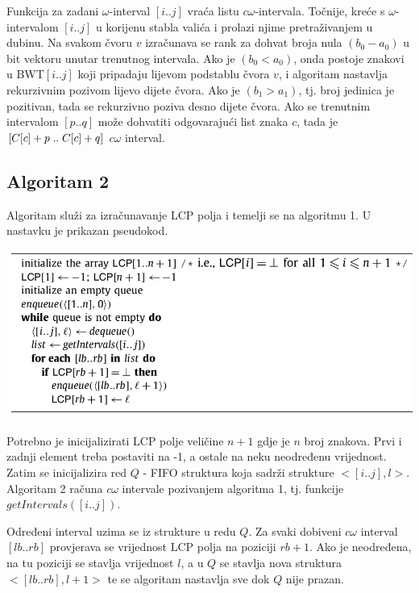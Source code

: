 \documentclass[times, utf8, seminar, numeric]{fer}
\begin{document}
Funkcija za zadani $\omega$-interval $[i..j]$ vraća listu $c\omega$-intervala. Točnije, kreće s $\omega$-intervalom $[i..j]$ u korijenu stabla valića i prolazi njime pretraživanjem u dubinu.
Na svakom čvoru $v$ izračunava se rank za dohvat broja nula $(b_{0}-a_{0})$ u bit vektoru unutar trenutnog intervala. Ako je $(b_{0}<a_{0})$, onda postoje znakovi u BWT$[i..j]$ koji pripadaju lijevom podstablu čvora $v$, i algoritam nastavlja rekurzivnim pozivom lijevo dijete čvora. Ako je $(b_{1} > a_{1})$, tj. broj jedinica je pozitivan, tada se rekurzivno poziva desno dijete čvora. Ako se trenutnim intervalom $[p .. q]$ može dohvatiti odgovarajući list znaka $c$, tada je $[C[c] + p \hspace{1mm} ..\hspace{1mm} C[c] + q]$ $c\omega$ interval. 

\subsection{Algoritam 2}

Algoritam služi za izračunavanje LCP polja i temelji se na algoritmu 1. U nastavku je prikazan pseudokod.

\begin{center}
	\includegraphics[scale=0.5]{slike/algorithm_2.png}
	\label{alg2}
\end{center}

Potrebno je inicijalizirati LCP polje veličine $n+1$ gdje je $n$ broj znakova. Prvi i zadnji element treba postaviti na -1, a ostale na neku neodređenu vrijednost. Zatim se inicijalizira red $Q$ - FIFO struktura koja sadrži strukture $<[i..j], l>$. Algoritam 2 računa $c\omega$ intervale pozivanjem algoritma 1, tj. funkcije $getIntervals([i..j])$.

Određeni interval uzima se iz strukture u redu $Q$. Za svaki dobiveni $c\omega$ interval $[lb..rb]$ provjerava se vrijednost LCP polja na poziciji $rb + 1$. Ako je neodređena, na tu poziciji se stavlja vrijednost $l$, a u $Q$ se stavlja nova struktura $<[lb..rb], l+1>$ te se algoritam nastavlja sve dok $Q$ nije prazan.
\end{document}
